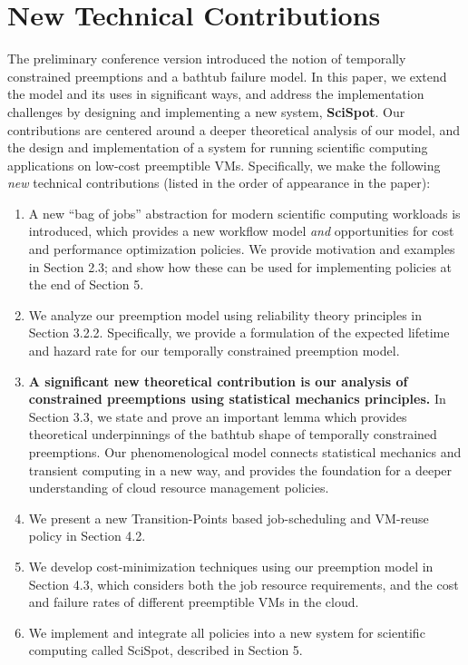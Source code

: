 \documentclass{article}
\begin{document}
\section{New Technical Contributions}

The preliminary conference version introduced the notion of temporally constrained preemptions and a bathtub failure model.
In this paper, we extend the model and its uses in significant ways, and address the implementation challenges by designing and implementing a new system, \textbf{SciSpot}. 
Our contributions are centered around a deeper theoretical analysis of our model, and the design and implementation of a system for running scientific computing applications on low-cost preemptible VMs. 
Specifically, we make the following \emph{new} technical contributions (listed in the order of appearance in the paper): 

\begin{enumerate}

\item A new ``bag of jobs'' abstraction for modern scientific computing workloads is introduced, which provides a new workflow model \emph{and} opportunities for cost and performance optimization policies. We provide motivation and examples in Section 2.3; and show how these can be used for implementing policies at the end of Section 5. 
  
\item We analyze our preemption model using reliability theory principles in Section 3.2.2. Specifically, we provide a formulation of the expected lifetime and hazard rate for our temporally constrained preemption model.
 
\item \textbf{A significant new theoretical contribution is our analysis of constrained preemptions using statistical mechanics principles.} In Section 3.3, we state and prove an important lemma which provides theoretical underpinnings of the bathtub shape of temporally constrained preemptions. Our phenomenological model connects statistical mechanics and transient computing in a new way, and provides the foundation for a deeper understanding of cloud resource management policies. 

\item We present a new Transition-Points based job-scheduling and VM-reuse policy in Section 4.2. 

\item We develop cost-minimization techniques using our preemption model in Section 4.3, which considers both the job resource requirements, and the cost and failure rates of different preemptible VMs in the cloud. 

\item We implement and integrate all policies into a new system for scientific computing called SciSpot, described in Section 5. 

\end{enumerate}
\end{document}
